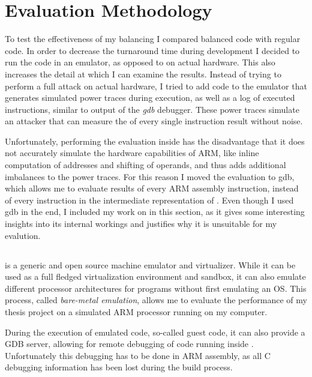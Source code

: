 \chapter{Evaluation Methodology}
\label{evaluation}
To test the effectiveness of my balancing I compared balanced code with regular code.
In order to decrease the turnaround time during development I decided to run the code in an emulator, as opposed to on actual hardware.
This also increases the detail at which I can examine the results.
Instead of trying to perform a full \poweranalysis{} attack on actual hardware, I tried to add code to the \qemu{} emulator that generates simulated power traces during execution, as well as a log of executed instructions, similar to output of the \emph{gdb} debugger.
These power traces simulate an attacker that can measure the \hammingw{} of every single instruction result without noise.

Unfortunately, performing the evaluation inside \qemu{} has the disadvantage that it does not accurately simulate the hardware capabilities of ARM, like inline computation of addresses and shifting of operands, and thus adds additional imbalances to the power traces.
For this reason I moved the evaluation to gdb, which allows me to evaluate results of every ARM assembly instruction, instead of every instruction in the intermediate representation of \qemu{}.
Even though I used gdb in the end, I included my work on \qemu{} in this section, as it gives some interesting insights into its internal workings and justifies why it is unsuitable for my evalution.

\section{\qemu{}}
\qemu{} is a generic and open source machine emulator and virtualizer.\cite{bellard2005qemu}
While it can be used as a full fledged virtualization environment and sandbox, it can also emulate different processor architectures for programs without first emulating an OS.
This process, called \emph{bare-metal emulation}, allows me to evaluate the performance of my thesis project on a simulated ARM processor running on my computer.

During the execution of emulated code, so-called guest code, it can also provide a GDB server, allowing for remote debugging of code running inside \qemu{}.
Unfortunately this debugging has to be done in ARM assembly, as all C debugging information has been lost during the build process.

